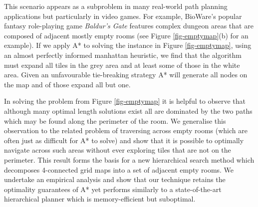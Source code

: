 This scenario appears as a subproblem in many real-world path planning applications but particularly
in video games.
For example, BioWare's popular fantasy role-playing game \emph{Baldur's Gate} features complex dungeon
 areas that are composed of adjacent mostly empty rooms (see Figure \ref{fig-emptymap}(b) for an example).
If we apply A* \cite{hart68} to solving the instance in Figure \ref{fig-emptymap}, using an almost 
perfectly informed manhattan heuristic, we find that the algorithm must expand all tiles in the grey 
area and at least some of those in the white area.
Given an unfavourable tie-breaking strategy A* will generate all nodes on the map and of those expand 
all but one.
\par
In solving the problem from Figure \ref{fig-emptymap} it is helpful to observe that although many optimal 
length solutions exist all are dominated by the two paths which may be found along the perimeter of 
the room. 
We generalise this observation to the related problem of traversing across empty rooms (which are 
often just as difficult for A* to solve) and show that it is possible to optimally navigate across 
such areas without ever exploring tiles that are not on the perimeter.
This result forms the basis for a new hierarchical search method which decomposes 4-connected grid maps
into a set of adjacent empty rooms. 
We undertake an empirical analysis and show that our technique retains the optimality guarantees of A* 
yet performs similarly to a state-of-the-art hierarchical planner which is memory-efficient but suboptimal.

